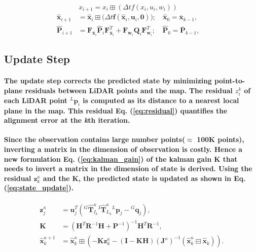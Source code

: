 \begin{equation}
	x_{i+1} = x_i \boxplus (\Delta t f(x_i, u_i, w_i))
	\label{eq:fwd_pgn}
\end{equation}
\begin{equation}\label{eq:prediction}
	\begin{aligned}
		\hat{\mathbf{x}}_{i+1} &= \hat{\mathbf{x}}_i \boxplus \big(\Delta t \mathbf{f}(\hat{\mathbf{x}}_i, \mathbf{u}_i, \mathbf{0})\big) ; \quad \hat{\mathbf{x}}_0 = \bar{\mathbf{x}}_{k-1}, \\
		\hat{\mathbf{P}}_{i+1} &= \mathbf{F}_{\bar{\mathbf{x}}_i} \hat{\mathbf{P}}_i \mathbf{F}_{\bar{\mathbf{x}}_i}^T + \mathbf{F}_{\mathbf{w}_i} \mathbf{Q}_i \mathbf{F}_{\mathbf{w}_i}^T ; \quad \hat{\mathbf{P}}_0 = \bar{\mathbf{P}}_{k-1},
	\end{aligned}
\end{equation}
\subsection{Update Step}
\paragraph{\textnormal{The update step corrects the predicted state by minimizing point-to-plane residuals between LiDAR points and the map. The residual $z^k_i$ of each LiDAR point $^L\textbf{p}_i$ is computed as its distance to a nearest local plane in the map. This residual Eq. (\ref{eq:residual}) quantifies the alignment error at the \textit{k}th iteration.}}
\paragraph{\textnormal{Since the observation contains large number points($\approx$ 100K points), inverting a matrix in the dimension of observation is costly. Hence a new formulation Eq. (\ref{eq:kalman_gain}) of the kalman gain \textbf{K} that needs to invert a matrix in the dimension of state is derived. Using the residual $\mathbf{z}_k^\kappa $ and the \textbf{K}, the predicted state is updated as shown in Eq. (\ref{eq:state_update}).}}

\begin{align}
	 \quad \mathbf{z}_j^\kappa &= \mathbf{u}_j^T \left( {}^G\hat{\mathbf{T}}_{I_k}^\kappa {}^I\hat{\mathbf{T}}_{L_k}^\kappa {}^L\mathbf{p}_j - {}^G\mathbf{q}_j \right), \label{eq:residual} \\
	 \quad \mathbf{K} &= \left( \mathbf{H}^T \mathbf{R}^{-1} \mathbf{H} + \mathbf{P}^{-1} \right)^{-1} \mathbf{H}^T \mathbf{R}^{-1}, \label{eq:kalman_gain} \\
	 \quad \hat{\mathbf{x}}_k^{\kappa+1} &= \hat{\mathbf{x}}_k^\kappa \boxplus \left( -\mathbf{K} \mathbf{z}_k^\kappa - (\mathbf{I} - \mathbf{K} \mathbf{H}) (\mathbf{J}^\kappa)^{-1} (\hat{\mathbf{x}}_k^\kappa \boxminus \hat{\mathbf{x}}_k) \right). \label{eq:state_update}
\end{align}

